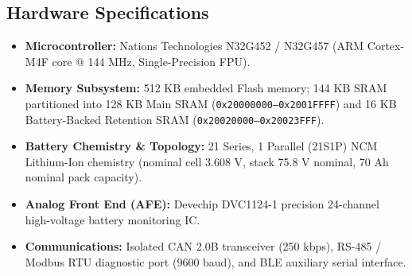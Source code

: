 \documentclass[10pt,a4paper]{article}
\begin{document}
\subsection{Hardware Specifications}
\begin{itemize}
    \item \textbf{Microcontroller:} Nations Technologies N32G452 / N32G457 (ARM Cortex-M4F core @ 144 MHz, Single-Precision FPU).
    \item \textbf{Memory Subsystem:} 512 KB embedded Flash memory; 144 KB SRAM partitioned into 128 KB Main SRAM (\texttt{0x20000000--0x2001FFFF}) and 16 KB Battery-Backed Retention SRAM (\texttt{0x20020000--0x20023FFF}).
    \item \textbf{Battery Chemistry \& Topology:} 21 Series, 1 Parallel (21S1P) NCM Lithium-Ion chemistry (nominal cell 3.608 V, stack 75.8 V nominal, 70 Ah nominal pack capacity).
    \item \textbf{Analog Front End (AFE):} Devechip DVC1124-1 precision 24-channel high-voltage battery monitoring IC.
    \item \textbf{Communications:} Isolated CAN 2.0B transceiver (250 kbps), RS-485 / Modbus RTU diagnostic port (9600 baud), and BLE auxiliary serial interface.
\end{itemize}
\end{document}
